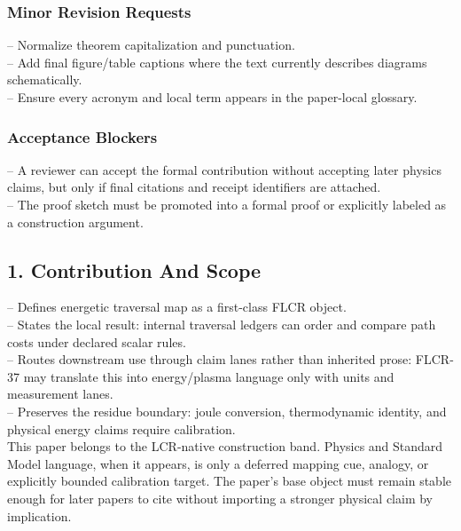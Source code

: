 \documentclass[11pt]{article}
\begin{document}
\subsubsection*{Minor Revision Requests}

\noindent{}-- Normalize theorem capitalization and punctuation.\\
\noindent{}-- Add final figure/table captions where the text currently describes diagrams schematically.\\
\noindent{}-- Ensure every acronym and local term appears in the paper-local glossary.\\

\subsubsection*{Acceptance Blockers}

\noindent{}-- A reviewer can accept the formal contribution without accepting later physics claims, but only if final citations and receipt identifiers are attached.\\
\noindent{}-- The proof sketch must be promoted into a formal proof or explicitly labeled as a construction argument.\\


\subsection*{1. Contribution And Scope}

\noindent{}-- Defines energetic traversal map as a first-class FLCR object.\\
\noindent{}-- States the local result: internal traversal ledgers can order and compare path costs under declared scalar rules.\\
\noindent{}-- Routes downstream use through claim lanes rather than inherited prose: FLCR-37 may translate this into energy/plasma language only with units and measurement lanes.\\
\noindent{}-- Preserves the residue boundary: joule conversion, thermodynamic identity, and physical energy claims require calibration.\\

This paper belongs to the LCR-native construction band. Physics and Standard Model language, when it appears, is only a deferred mapping cue, analogy, or explicitly bounded calibration target. The paper's base object must remain stable enough for later papers to cite without importing a stronger physical claim by implication.
\end{document}
